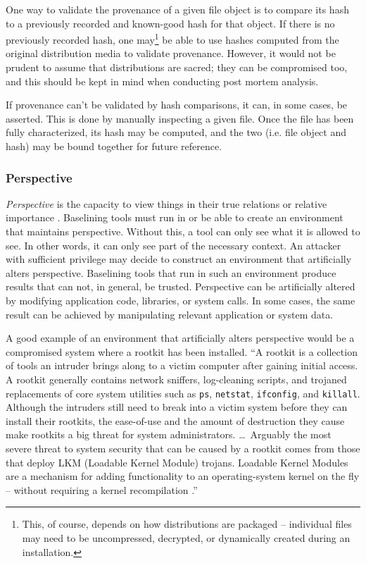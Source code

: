 \documentclass[10pt]{article}
\begin{document}
One way to validate the provenance of a given file object is to
compare its hash to a previously recorded and known-good hash for
that object.  If there is no previously recorded hash, one
may\footnote{This, of course, depends on how distributions are
packaged -- individual files may need to be uncompressed, decrypted,
or dynamically created during an installation.} be able to use hashes
computed from the original distribution media to validate provenance.
However, it would not be prudent to assume that distributions are
sacred; they can be compromised too, and this should be kept in
mind when conducting post mortem analysis.

If provenance can't be validated by hash comparisons, it can, in
some cases, be asserted.  This is done by manually inspecting a
given file.  Once the file has been fully characterized, its hash
may be computed, and the two (i.e. file object and hash) may be
bound together for future reference.

\subsubsection{Perspective}

{\it Perspective} is the capacity to view things in their true
relations or relative importance \cite{dictionary}.  Baselining
tools must run in or be able to create an environment that maintains
perspective.  Without this, a tool can only see what it is allowed
to see.  In other words, it can only see part of the necessary
context.  An attacker with sufficient privilege may decide to
construct an environment that artificially alters perspective.
Baselining tools that run in such an environment produce results
that can not, in general, be trusted.  Perspective can be artificially
altered by modifying application code, libraries, or system calls.
In some cases, the same result can be achieved by manipulating
relevant application or system data.

A good example of an environment that artificially alters perspective
would be a compromised system where a rootkit has been installed.
``A rootkit is a collection of tools an intruder brings along to
a victim computer after gaining initial access.  A rootkit generally
contains network sniffers, log-cleaning scripts, and trojaned
replacements of core system utilities such as \texttt{ps},
\texttt{netstat}, \texttt{ifconfig}, and \texttt{killall}.  Although
the intruders still need to break into a victim system before they
can install their rootkits, the ease-of-use and the amount of
destruction they cause make rootkits a big threat for system
administrators. \ldots\ Arguably the most severe threat to system
security that can be caused by a rootkit comes from those that
deploy LKM (Loadable Kernel Module) trojans.  Loadable Kernel Modules
are a mechanism for adding functionality to an operating-system
kernel on the fly -- without requiring a kernel recompilation
\cite{rootkit}.''
\end{document}
